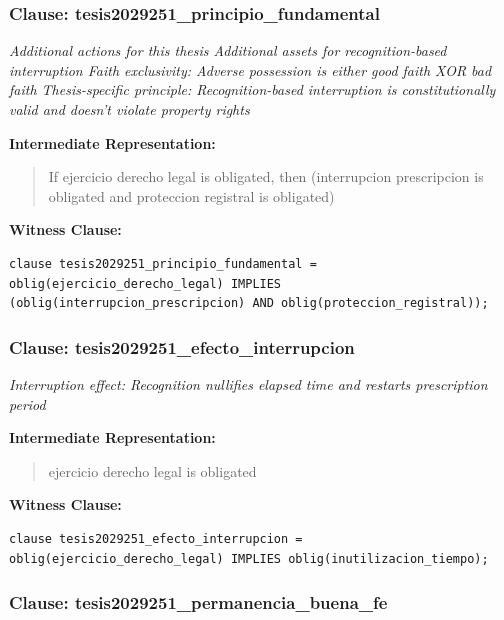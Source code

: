 \documentclass[11pt,a4paper]{article}
\begin{document}
\subsubsection{Clause: tesis2029251\_principio\_fundamental}

\textit{Additional actions for this thesis Additional assets for recognition-based interruption Faith exclusivity: Adverse possession is either good faith XOR bad faith Thesis-specific principle: Recognition-based interruption is constitutionally valid and doesn't violate property rights}

\textbf{Intermediate Representation:}

\begin{quote}
If ejercicio derecho legal is obligated, then (interrupcion prescripcion is obligated and proteccion registral is obligated)
\end{quote}

\textbf{Witness Clause:}

\begin{lstlisting}[style=witnessstyle, language=Witness]
clause tesis2029251_principio_fundamental = oblig(ejercicio_derecho_legal) IMPLIES (oblig(interrupcion_prescripcion) AND oblig(proteccion_registral));
\end{lstlisting}

\subsubsection{Clause: tesis2029251\_efecto\_interrupcion}

\textit{Interruption effect: Recognition nullifies elapsed time and restarts prescription period}

\textbf{Intermediate Representation:}

\begin{quote}
ejercicio derecho legal is obligated
\end{quote}

\textbf{Witness Clause:}

\begin{lstlisting}[style=witnessstyle, language=Witness]
clause tesis2029251_efecto_interrupcion = oblig(ejercicio_derecho_legal) IMPLIES oblig(inutilizacion_tiempo);
\end{lstlisting}

\subsubsection{Clause: tesis2029251\_permanencia\_buena\_fe}
\end{document}
